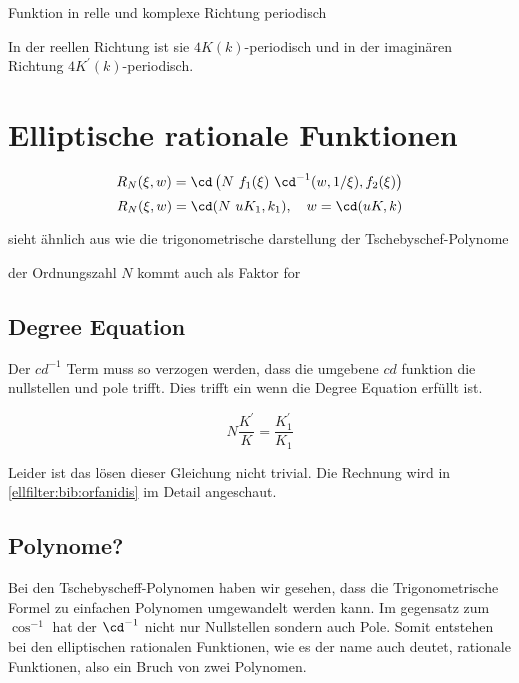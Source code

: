 \begin{refsection}
Funktion in relle und komplexe Richtung periodisch

In der reellen Richtung ist sie $4K(k)$-periodisch und in der imaginären Richtung $4K^\prime(k)$-periodisch.





\section{Elliptische rationale Funktionen}


\begin{equation}
    R_N(\xi, w) = \cd \left(N~f_1(\xi)~\cd^{-1}(w, 1/\xi), f_2(\xi)\right)
\end{equation}
\begin{equation}
    R_N(\xi, w) = \cd (N~u K_1, k_1), \quad w= \cd(uK, k)
\end{equation}


sieht ähnlich aus wie die trigonometrische darstellung der Tschebyschef-Polynome

der Ordnungszahl $N$ kommt auch als Faktor for 



\subsection{Degree Equation}

Der $cd^{-1}$ Term muss so verzogen werden, dass die umgebene $cd$ funktion die nullstellen und pole trifft.
Dies trifft ein wenn die Degree Equation erfüllt ist.

\begin{equation}
    N \frac{K^\prime}{K} = \frac{K^\prime_1}{K_1}
\end{equation}


Leider ist das lösen dieser Gleichung nicht trivial.
Die Rechnung wird in \ref{ellfilter:bib:orfanidis} im Detail angeschaut.


\subsection{Polynome?}

Bei den Tschebyscheff-Polynomen haben wir gesehen, dass die Trigonometrische Formel zu einfachen Polynomen umgewandelt werden kann.
Im gegensatz zum $\cos^{-1}$ hat der $\cd^{-1}$ nicht nur Nullstellen sondern auch Pole.
Somit entstehen bei den elliptischen rationalen Funktionen, wie es der name auch deutet, rationale Funktionen, also ein Bruch von zwei Polynomen.





\end{refsection}
